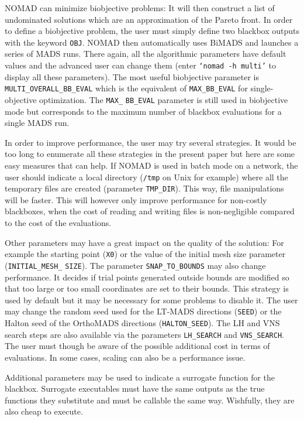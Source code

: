 \documentclass[12pt,english]{article}
\newcommand{\nomad}{NOMAD\xspace}
\newcommand{\mads}{MADS\xspace}
\newcommand{\orthomads}{OrthoMADS\xspace}
\newcommand{\ltmads}{LT-MADS\xspace}
\newcommand{\bimads}{BiMADS\xspace}
\newcommand{\bb}{blackbox\xspace}
\newcommand{\bbs}{blackboxes\xspace}
\newcommand{\search}{{search}\xspace}
\begin{document}
\nomad can minimize biobjective problems: It will then construct a list
  of undominated solutions which are an approximation of the Pareto front.
In order to define a biobjective problem, the user must simply
  define two \bb outputs with the keyword \texttt{OBJ}.
\nomad then automatically uses \bimads and
  launches a series of \mads runs.
There again, all the algorithmic parameters have default values and the
  advanced user can change them
  (enter \texttt{`nomad -h multi'} to display all these parameters).
 The most useful biobjective parameter is \texttt{MULTI\_OVERALL\_BB\_EVAL}
 which is the equivalent of \texttt{MAX\_BB\_EVAL} for single-objective optimization.
The \texttt{MAX\_} \texttt{BB\_EVAL}
  parameter  is still used in biobjective mode but corresponds
  to the maximum number of \bb evaluations for a single \mads run.

In order to improve performance, the user may try several strategies.
It would be too long to enumerate all these strategies in the present paper
  but here are
 some easy measures that can help.
If \nomad is used in batch mode
   on a network, the user should indicate a local directory
   (\texttt{/tmp} on Unix for example)
   where all the temporary files are created
(parameter \texttt{TMP\_DIR}).
This way, file manipulations will be faster.
This will however only improve performance for
  non-costly \bbs, when the cost of reading and writing
  files is non-negligible compared to the cost of the evaluations.

Other parameters may have a great impact on the quality of the solution: For example
  the starting point
  (\texttt{X0})
  or the value of the initial mesh size parameter
  (\texttt{INITIAL\_MESH\_} \texttt{SIZE}).
The parameter \texttt{SNAP\_TO\_BOUNDS} may also change performance.
It decides if trial points generated outside bounds are
  modified so that too large or too small coordinates are set
  to their bounds.
This strategy is used by default but it may be necessary for some problems
  to disable it.
The user may change the random seed used for the \ltmads directions (\texttt{SEED})
  or the Halton seed of the \orthomads directions (\texttt{HALTON\_SEED}).
The LH and VNS \search steps are also available via
 the parameters
 \texttt{LH\_SEARCH} and \texttt{VNS\_SEARCH}.
 The user must though be aware of the possible additional cost in terms of evaluations.
In some cases, scaling can also be a performance issue.

 Additional parameters may be used to indicate a surrogate function for the \bb.
Surrogate executables must have the same outputs as the true functions they substitute
and must be callable the same way.
Wishfully, they are also cheap to execute.
\end{document}
